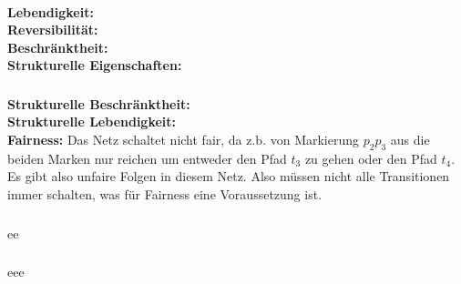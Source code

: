 \documentclass[a4paper,12pt]{scrartcl}
\begin{document}
\\
\textbf{Lebendigkeit:} \\
\textbf{Reversibilität:} \\
\textbf{Beschränktheit:} \\
\textbf{Strukturelle Eigenschaften:\\}
\subsubsection{}
\textbf{Strukturelle Beschränktheit:}\\
\textbf{Strukturelle Lebendigkeit:}\\
\textbf{Fairness: }Das Netz schaltet nicht fair, da z.b. von Markierung $p_2 p_3$ aus die beiden Marken nur reichen um entweder den Pfad $t_3$ zu gehen oder den Pfad $t_4$. Es gibt also unfaire Folgen in diesem Netz. Also müssen nicht alle Transitionen immer schalten, was für Fairness eine Voraussetzung ist.
\subsubsection{}
ee
\subsubsection{}
eee
\end{document}
